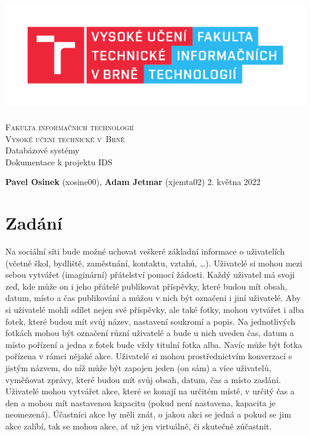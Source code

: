 \documentclass[11pt,a4paper]{article}
\begin{document}
\begin{titlepage}
    \begin{center}
        \includegraphics[height = 160pt]{FIT_logo}\\
		
		{\Huge \textsc{Fakulta informačních technologií}\\[5pt]}
		{\Huge \textsc{Vysoké učení technické v~Brně}}\\
		{\LARGE Databázové systémy\\[5pt]}
		{\LARGE Dokumentace k projektu IDS\\[30pt]}

    \end{center}
    {
        \textbf{Pavel Osinek} (xosine00), \textbf{Adam Jetmar} (xjemta02)
		\hfill
		2. května 2022
	}
\end{titlepage}

\newpage
\tableofcontents
\newpage

\section{Zadání}
Na sociální síti bude možné uchovat veškeré základní informace o uživatelích
(včetně škol, bydliště, zaměstnání, kontaktu, vztahů, \dots). Uživatelé si mohou 
mezi sebou vytvářet (imaginární) přátelství pomocí žádosti. Každý uživatel
má svoji zeď, kde může on i jeho přátelé publikovat příspěvky, které budou 
mít obsah, datum, místo a čas publikování a můžou v nich být označeni i jiní 
uživatelé. Aby si uživatelé mohli sdílet nejen své příspěvky, ale také fotky,
mohou vytvářet i alba fotek, které budou mít svůj název, nastavení soukromí 
a popis. Na jednotlivých fotkách mohou být označení různí uživatelé a bude 
u nich uveden čas, datum a místo pořízení a jedna z fotek bude vždy titulní 
fotka alba. Navíc může být fotka pořízena v rámci nějaké akce. Uživatelé si 
mohou prostřednictvím konverzací s jistým názvem, do níž může být zapojen
jeden (on sám) a více uživatelů, vyměňovat zprávy, které budou mít svůj 
obsah, datum, čas a místo zaslání. Uživatelé mohou vytvářet akce, které se 
konají na určitém místě, v určitý čas a den a mohou mít nastavenou kapacitu (pokud není nastavena, kapacita je neomezená). Účastníci akce by měli znát, o 
jakou akci se jedná a pokud se jim akce zalíbí, tak se mohou akce, ať už jen 
virtuálně, či skutečně zúčastnit.
        
\end{document}
